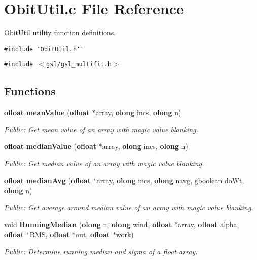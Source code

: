 \section{Obit\-Util.c File Reference}
\label{ObitUtil_8c}
Obit\-Util utility function definitions. 

{\tt \#include \char`\"{}Obit\-Util.h\char`\"{}}\par
{\tt \#include $<$gsl/gsl\_\-multifit.h$>$}\par
\subsection*{Functions}
\begin{CompactItemize}
\item 
{\bf ofloat} {\bf mean\-Value} ({\bf ofloat} $\ast$array, {\bf olong} incs, {\bf olong} n)
\begin{CompactList}\small\item\em Public: Get mean value of an array with magic value blanking. \item\end{CompactList}\item 
{\bf ofloat} {\bf median\-Value} ({\bf ofloat} $\ast$array, {\bf olong} incs, {\bf olong} n)
\begin{CompactList}\small\item\em Public: Get median value of an array with magic value blanking. \item\end{CompactList}\item 
{\bf ofloat} {\bf median\-Avg} ({\bf ofloat} $\ast$array, {\bf olong} incs, {\bf olong} navg, gboolean do\-Wt, {\bf olong} n)
\begin{CompactList}\small\item\em Public: Get average around median value of an array with magic value blanking. \item\end{CompactList}\item 
void {\bf Running\-Median} ({\bf olong} n, {\bf olong} wind, {\bf ofloat} $\ast$array, {\bf ofloat} alpha, {\bf ofloat} $\ast$RMS, {\bf ofloat} $\ast$out, {\bf ofloat} $\ast$work)
\begin{CompactList}\small\item\em Public: Determine running median and sigma of a float array. \item\end{CompactList}\item 

\end{CompactItemize}
